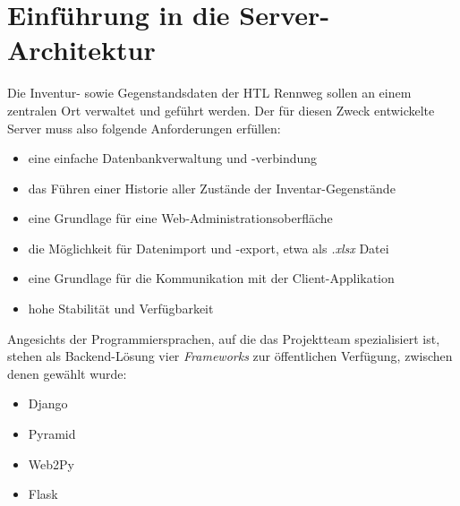 \chapter{Einführung in die Server-Architektur}
\label{intro_server}
\renewcommand{\kapitelautor}{Autor: Mathias Möller}

Die Inventur- sowie Gegenstandsdaten der HTL Rennweg sollen an einem
zentralen Ort verwaltet und geführt werden. Der für diesen Zweck
entwickelte Server muss also folgende Anforderungen erfüllen:

\begin{itemize}
\tightlist
\item
  eine einfache Datenbankverwaltung und -verbindung
\item
  das Führen einer Historie aller Zustände der Inventar-Gegenstände
\item
  eine Grundlage für eine Web-Administrationsoberfläche
\item
  die Möglichkeit für Datenimport und -export, etwa als
  \emph{.xlsx} Datei
\item
  eine Grundlage für die Kommunikation mit der Client-Applikation
\item
  hohe Stabilität und Verfügbarkeit
\end{itemize}

Angesichts der Programmiersprachen, auf die das Projektteam
spezialisiert ist, stehen als Backend-Lösung vier
\emph{Frameworks}
zur öffentlichen Verfügung, zwischen denen gewählt wurde:

\begin{itemize}
\tightlist
\item
  Django \cite{django}
\item
  Pyramid \cite{pyramid}
\item
  Web2Py \cite{web2py}
\item
  Flask \cite{flask}
\end{itemize}

